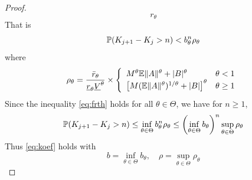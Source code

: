 \begin{proof}
\[  r_{\theta}
  \]
  That is
  \begin{equation}
    \label{eq:frth}
    \P (K_{j+1} - K_j > n) < b_{\theta}^n \rho_{\theta}
  \end{equation}
  where
  \[
  \rho_{\theta} = {
    \bar r_{\theta}
    \over
    \underline r_{\theta} \underline V^\theta
  } \times \left\{
  \begin{array}{ll}
    M^\theta \E \|A\|^\theta + |B|^\theta
    &
    \theta < 1
    \\
    \left[
      M (\E \|A\|^\theta)^{1/\theta} + |B|      
    \right]^\theta
    &
    \theta \geq 1
  \end{array}
  \right.
  \]
  Since the inequality \eqref{eq:frth} holds for all
  $\theta \in \Theta$, we have for $n \geq 1$,
  \[
  \P (K_{j+1} - K_j> n)
  \leq
  \inf_{\theta \in \Theta}
  b_\theta^n \rho_\theta
  \leq
  \left(
    \inf_{\theta \in \Theta}
    b_{\theta}
    \right)^n
  \sup_{\theta \in \Theta} \rho_{\theta}
  \]
  Thus \eqref{eq:koef} holds with
  \begin{equation}
    \label{eq:b_def}
    b = \inf_{\theta \in \Theta} b_{\theta},
    \quad
    \rho = \sup_{\theta \in \Theta} \rho_{\theta}
  \end{equation}
\end{proof}

